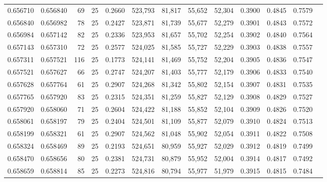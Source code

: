 \begin{tabular}{rrrrrrrrrrrrr}
0.656710 & 0.656840 &    69 &  25 &                                     0.2660 & 523,793 &  81,817 &  55,652 &  52,304 & 0.3900 & 0.4845 & 0.7579 \\
0.656840 & 0.656982 &    78 &  25 &                                     0.2427 & 523,871 &  81,739 &  55,677 &  52,279 & 0.3901 & 0.4843 & 0.7572 \\
0.656984 & 0.657142 &    82 &  25 &                                     0.2336 & 523,953 &  81,657 &  55,702 &  52,254 & 0.3902 & 0.4840 & 0.7564 \\
0.657143 & 0.657310 &    72 &  25 &                                     0.2577 & 524,025 &  81,585 &  55,727 &  52,229 & 0.3903 & 0.4838 & 0.7557 \\
0.657311 & 0.657521 &   116 &  25 &                                     0.1773 & 524,141 &  81,469 &  55,752 &  52,204 & 0.3905 & 0.4836 & 0.7547 \\
0.657521 & 0.657627 &    66 &  25 &                                     0.2747 & 524,207 &  81,403 &  55,777 &  52,179 & 0.3906 & 0.4833 & 0.7540 \\
0.657628 & 0.657764 &    61 &  25 &                                     0.2907 & 524,268 &  81,342 &  55,802 &  52,154 & 0.3907 & 0.4831 & 0.7535 \\
0.657765 & 0.657920 &    83 &  25 &                                     0.2315 & 524,351 &  81,259 &  55,827 &  52,129 & 0.3908 & 0.4829 & 0.7527 \\
0.657920 & 0.658060 &    71 &  25 &                                     0.2604 & 524,422 &  81,188 &  55,852 &  52,104 & 0.3909 & 0.4826 & 0.7520 \\
0.658061 & 0.658197 &    79 &  25 &                                     0.2404 & 524,501 &  81,109 &  55,877 &  52,079 & 0.3910 & 0.4824 & 0.7513 \\
0.658199 & 0.658321 &    61 &  25 &                                     0.2907 & 524,562 &  81,048 &  55,902 &  52,054 & 0.3911 & 0.4822 & 0.7508 \\
0.658324 & 0.658469 &    89 &  25 &                                     0.2193 & 524,651 &  80,959 &  55,927 &  52,029 & 0.3912 & 0.4819 & 0.7499 \\
0.658470 & 0.658656 &    80 &  25 &                                     0.2381 & 524,731 &  80,879 &  55,952 &  52,004 & 0.3914 & 0.4817 & 0.7492 \\
0.658659 & 0.658814 &    85 &  25 &                                     0.2273 & 524,816 &  80,794 &  55,977 &  51,979 & 0.3915 & 0.4815 & 0.7484 \\

\end{tabular}

